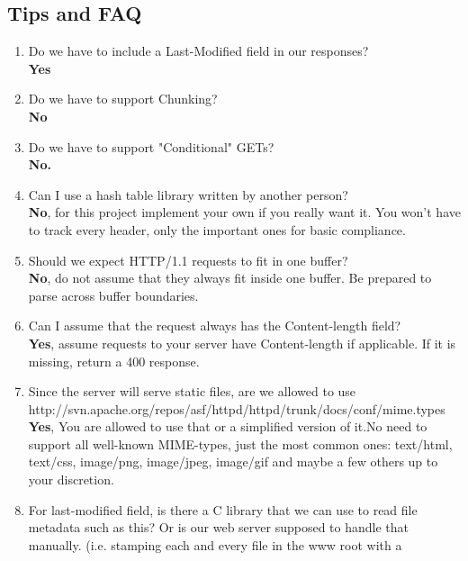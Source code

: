 \subsection{Tips and FAQ}
\begin{enumerate}
  \item Do we have to include a Last-Modified field in our responses?\\
    \textbf{Yes}
    \item Do we have to support Chunking?\\
    \textbf{No}
    \item Do we have to support "Conditional" GETs?\\
    \textbf{No.}
    \item Can I use a hash table library written by another person?\\
    \textbf{No}, for this project implement your own if you really want it. You won't have to track every header, only the important ones for basic compliance.
    \item Should we expect HTTP/1.1 requests to fit in one buffer?\\
    \textbf{No}, do not assume that they always fit inside one buffer. Be prepared to parse across buffer boundaries.
    \item Can I assume that the request always has the Content-length field?\\
    \textbf{Yes}, assume requests to your server have Content-length if applicable. If it is missing, return a 400 response.
    \item Since the server will serve static files, are we allowed to use http://svn.apache.org/repos/asf/httpd/httpd/trunk/docs/conf/mime.types\\
    \textbf{Yes}, You are allowed to use that or a simplified version of it.No need to support all well-known MIME-types, just the most common ones: text/html, text/css, image/png, image/jpeg, image/gif and maybe a few others up to your discretion.
    \item For last-modified field, is there a C library that we can use to read file
     metadata  such as this? Or is our web server supposed to handle that
     manually. (i.e. stamping each and every file in the www root with a

\end{enumerate}
